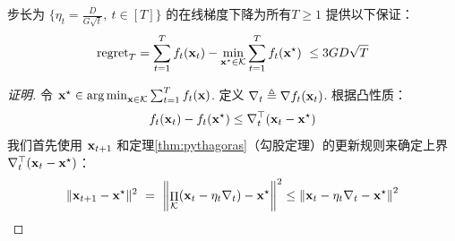 \begin{theorem}\label{thm:gradient}
步长为 $\{\eta_t = \frac{D}{G \sqrt{t}} , \ t \in [T] \}$ 的在线梯度下降为所有$T \geq 1$ 提供以下保证：
$$ \mathrm{{regret}}_T = \sum_{t=1}^{T} f_t(\mathbf{x}_t) -\min_{\mathbf{x}^\star \in \mathcal K}\sum_{t=1}^{T}
f_t(\mathbf{x}^\star)\ \leq  {3} {G D}\sqrt{T} $$
\end{theorem}


\begin{proof}[证明]
令
$\mathbf{x}^\star \in \operatorname*{\arg\min}_{\mathbf{x} \in \mathcal K} \sum_{t=1}^T f_t(\mathbf{x})$.
定义
$\nabla_t \triangleq \nabla f_{t}(\mathbf{x}_{t})$. 
根据凸性质：
\begin{eqnarray}  \label{eqn:gradient_inequality}
f_t(\mathbf{x}_t) - f_t(\mathbf{x}^\star) \leq   \nabla_t^\top (\mathbf{x}_t - \mathbf{x}^\star)
\end{eqnarray}
我们首先使用 $\mathbf{x}_{t+1}$ 和定理\ref{thm:pythagoras}（勾股定理）的更新规则来确定上界 $\nabla_t^\top (\mathbf{x}_t-\mathbf{x}^\star)$：
\begin{equation} \label{eqn:ogdtriangle}
\| \mathbf{x}_{t+1}-\mathbf{x}^\star \|^2\ =\  \left\|\mathop{\Pi}_{\mathcal K} (\mathbf{x}_t - \eta_t
\nabla_{t}) -\mathbf{x}^\star\right\|^2 \leq  \left\|\mathbf{x}_t - \eta_t \nabla_t-\mathbf{x}^\star\right\|^2
\end{equation}


\end{proof}
